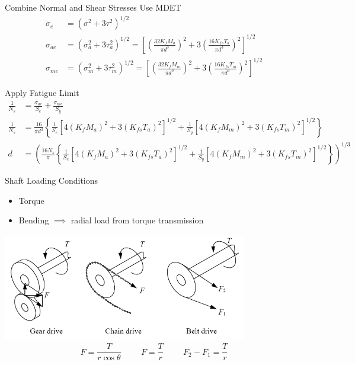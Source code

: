\documentclass[10pt, svgnames]{beamer}
\begin{document}
\begin{frame}[label={sec:org406d0fc}]{Combine Normal and Shear Stresses}
Use MDET
\begin{align*}
  \sigma_{e} &= \left( \sigma^{2} + 3 \tau^{2} \right)^{1/2} \\
  \sigma_{ae} &= \left( \sigma_{a}^{2} + 3 \tau_{a}^{2} \right)^{1/2} = \left[ \left( \frac{32 K_{f} M_{a}}{\pi d^{3}} \right)^{2} + 3 \left( \frac{16 K_{fs} T_{a}}{\pi d^{3}} \right)^{2} \right]^{1/2} \\
  \sigma_{me} &= \left( \sigma_{m}^{2} + 3 \tau_{m}^{2} \right)^{1/2} = \left[ \left( \frac{32 K_{f} M_{m}}{\pi d^{3}} \right)^{2} + 3 \left( \frac{16 K_{fs} T_{m}}{\pi d^{3}} \right)^{2} \right]^{1/2}
\end{align*}
\end{frame}

\begin{frame}[label={sec:orgec9221b}]{Apply Fatigue Limit}
\small
\begin{align*}
  \frac{1}{N_{s}} &= \frac{\sigma_{ae}}{S_{e}} + \frac{\sigma_{me}}{S_{y}} \\
  \frac{1}{N_{s}} &= \frac{16}{\pi d^{3}} \left\{ \frac{1}{S_{e}} \left[ 4 \left( K_{f} M_{a} \right)^{2} + 3 \left( K_{fs} T_{a} \right)^{2} \right]^{1/2} + \frac{1}{S_{y}} \left[ 4 \left( K_{f} M_{m} \right)^{2} + 3 \left( K_{fs} T_{m} \right)^{2} \right]^{1/2} \right\} \\[2em]
  d &= \left( \frac{16 N_{s}}{\pi} \left\{ \frac{1}{S_{e}} \left[ 4 \left( K_{f} M_{a} \right)^{2} + 3 \left( K_{fs} T_{a} \right)^{2} \right]^{1/2} + \frac{1}{S_{y}} \left[ 4 \left( K_{f} M_{m} \right)^{2} + 3 \left( K_{fs} T_{m} \right)^{2} \right]^{1/2} \right\} \right)^{1/3}
\end{align*}
\end{frame}

\begin{frame}[label={sec:org52a22db}]{Shaft Loading Conditions}
\begin{itemize}
\item Torque
\item Bending \(\implies\) radial load from torque transmission
\end{itemize}

\centering
\includegraphics[width=0.8\textwidth]{Pictures/torque-transmission}
$$ F = \dfrac{T}{r \cos \theta} \hspace{1cm} F = \dfrac{T}{r} \hspace{1cm} F_2 - F_1 = \dfrac{T}{r} $$
\end{frame}
\end{document}
